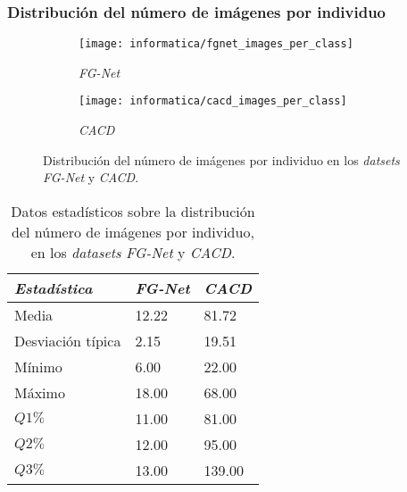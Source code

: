 \subsubsection{Distribución del número de imágenes por individuo}

\begin{figure}[!hbtp]
\centering
    \begin{subfigure}{.5\textwidth}
        \centering
        \texttt{[image: informatica/fgnet\_images\_per\_class]}
        \caption{\textit{FG-Net}}
    \end{subfigure}%
    \begin{subfigure}{.5\textwidth}
        \centering
        \texttt{[image: informatica/cacd\_images\_per\_class]}
        \caption{\textit{CACD}}
    \end{subfigure}
\caption{Distribución del número de imágenes por individuo en los \textit{datsets} \textit{FG-Net} y \textit{CACD}.}
    \label{img:comparativa_imagenes_por_individuo}
\end{figure}


\begin{table}[!hbtp]
\centering
\begin{tabular}{|l|l|l|}
    \hline
    \textbf{\textit{Estadística}} & \textbf{\textit{FG-Net}} & \textbf{\textit{CACD}} \\
    \hline

    Media             & 12.22 & 81.72  \\
    Desviación típica & 2.15  & 19.51  \\
    Mínimo            & 6.00  & 22.00  \\
    Máximo            & 18.00 & 68.00  \\
    $Q1 \%$           & 11.00 & 81.00  \\
    $Q2 \%$           & 12.00 & 95.00  \\
    $Q3 \%$           & 13.00 & 139.00 \\

    \hline

\end{tabular}
\caption{Datos estadísticos sobre la distribución del número de imágenes por individuo, en los \textit{datasets} \textit{FG-Net} y \textit{CACD}.}
    \label{table:comparativa_imagenes_por_individuo}
\end{table}

